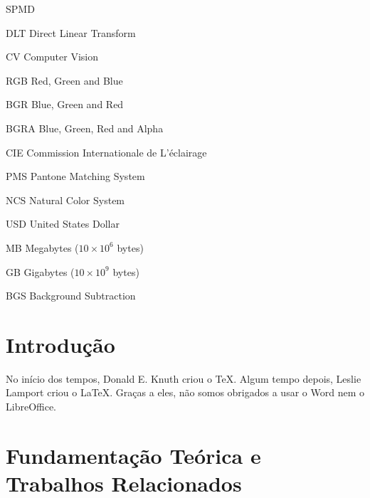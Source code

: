 \documentclass[ecp,tc]{iiufrgs}
\begin{document}
\begin{listofabbrv}{SPMD}
        \item[DLT] Direct Linear Transform
        \item[CV] Computer Vision
        \item[RGB] Red, Green and Blue
        \item[BGR] Blue, Green and Red
        \item[BGRA] Blue, Green, Red and Alpha
        \item[CIE] Commission Internationale de L'éclairage
        \item[PMS] Pantone Matching System
        \item[NCS] Natural Color System
        \item[USD] United States Dollar
        \item[MB] Megabytes ($ 10\times10^6 $ bytes)
        \item[GB] Gigabytes ($ 10\times10^9 $ bytes)
        \item[BGS] Background Subtraction  
\end{listofabbrv}


\listoffigures

\listoftables

\tableofcontents


\chapter{Introdução}
No início dos tempos, Donald E. Knuth criou o \TeX. Algum tempo depois, Leslie Lamport criou o \LaTeX. Graças a eles, não somos obrigados a usar o Word nem o LibreOffice.

\chapter{Fundamentação Teórica e Trabalhos Relacionados}
\end{document}
